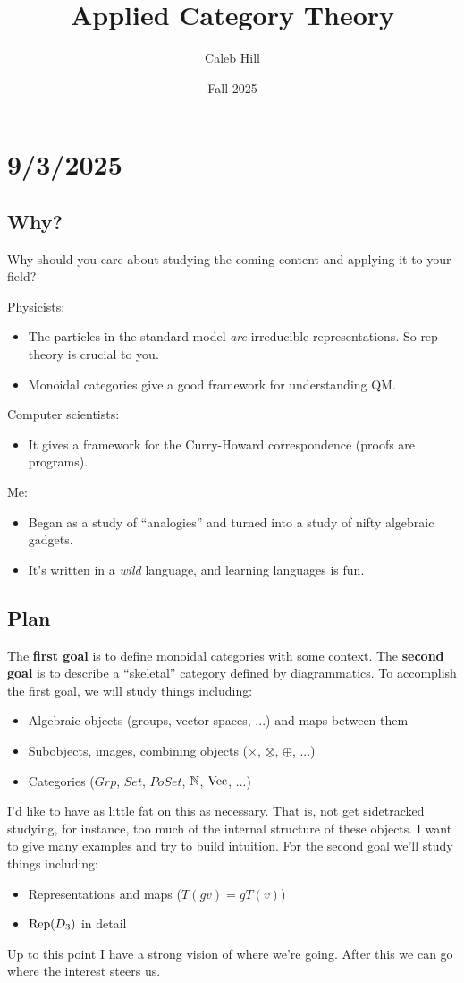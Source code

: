 \documentclass{article}
\title{Applied Category Theory}
\author{Caleb Hill}
\date{Fall 2025}
\begin{document}
\maketitle


\section*{9/3/2025}

\subsection*{Why?}
Why should you care about studying the coming content and applying it to your field?

Physicists:
\begin{itemize}
    \item The particles in the standard model {\it are} irreducible representations. 
    So rep theory is crucial to you.
    \item Monoidal categories give a good framework for understanding QM.
\end{itemize}
Computer scientists:
\begin{itemize}
    \item It gives a framework for the Curry-Howard correspondence (proofs are programs).
\end{itemize}
Me:
\begin{itemize}
    \item Began as a study of ``analogies'' and turned into a study of nifty algebraic gadgets.
    \item It's written in a {\it wild} language, and learning languages is fun.
\end{itemize}


\subsection*{Plan}
The {\bf first goal} is to define monoidal categories with some context. 
The {\bf second goal} is to describe a ``skeletal'' category defined by diagrammatics.
To accomplish the first goal, we will study things including:
\begin{itemize}
    \item Algebraic objects (groups, vector spaces, ...) and maps between them 
    \item Subobjects, images, combining objects ($\times$, $\otimes$, $\oplus$, ...) 
    \item Categories ($Grp$, $Set$, $PoSet$, $\mathbb{N}$, $\operatorname{Vec}$, ...)
\end{itemize}
I'd like to have as little fat on this as necessary.
That is, not get sidetracked studying, for instance, too much of the internal structure of these objects.
I want to give many examples and try to build intuition.
For the second goal we'll study things including:
\begin{itemize}
    \item Representations and maps ($T(gv) = gT(v)$)
    \item $\operatorname{Rep}(D_3)$ in detail
\end{itemize}
Up to this point I have a strong vision of where we're going. 
After this we can go where the interest steers us.
\end{document}
